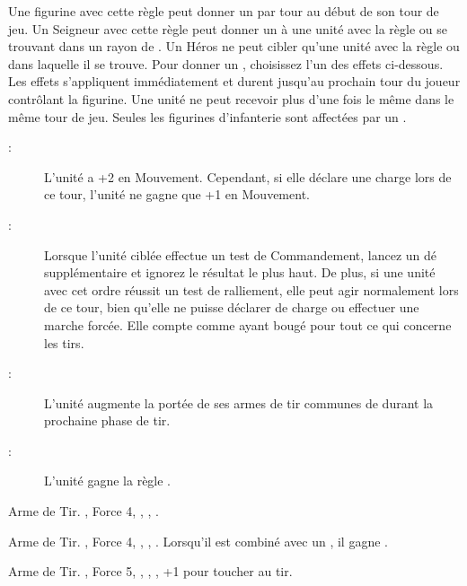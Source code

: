 Une figurine avec cette règle peut donner un \order{} par tour au début de son tour de jeu. Un Seigneur avec cette règle peut donner un \order à une unité avec la règle \supportunit{} ou \parentunit{} se trouvant dans un rayon de . Un Héros ne peut cibler qu'une unité avec la règle \supportunit{} ou \parentunit{} dans laquelle il se trouve. Pour donner un \order{}, choisissez l'un des effets ci-dessous. Les effets s'appliquent immédiatement et durent jusqu'au prochain tour du joueur contrôlant la figurine. Une unité ne peut recevoir plus d'une fois le même \order{} dans le même tour de jeu. Seules les figurines d'infanterie sont affectées par un \order{}.
\begin{description}
	\item [\onthedouble :] L'unité a +2 en Mouvement. Cependant, si elle déclare une charge lors de ce tour, l'unité ne gagne que +1 en Mouvement. 
	\item [\steadymen :] Lorsque l'unité ciblée effectue un test de Commandement, lancez un dé supplémentaire et ignorez le résultat le plus haut. De plus, si une unité avec cet ordre réussit un test de ralliement, elle peut agir normalement lors de ce tour, bien qu'elle ne puisse déclarer de charge ou effectuer une marche forcée. Elle compte comme ayant bougé pour tout ce qui concerne les tirs.
	\item [\readyaimfire :] L’unité augmente la portée de ses armes de tir communes de  durant la prochaine phase de tir. 
	\item [\braceforimpact :] L'unité gagne la règle \fightinextrarank{}.
\end{description}

\closearmyspecialrules

\vspace*{1.5cm}
\startarmyarmoury

\startitemlistonecol

\listitemonecol{\repeatergun} Arme de Tir. , Force 4, , , \unwieldy{}.

\listitemonecol{\repeaterpistol} Arme de Tir. , Force 4, , , \quicktofire{}. Lorsqu'il est combiné avec un \pistol{}, il gagne .

\listitemonecol{\longrifle} Arme de Tir. , Force 5, , , \unwieldy{}, +1 pour toucher au tir.

\enditemlistonecol

